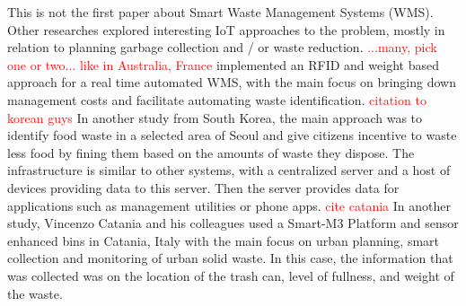 \documentclass{sigchi}
\newcommand\todo[1]{\textcolor{red}{#1}}
\begin{document}
This is not the first paper about Smart Waste Management Systems (WMS).
Other researches explored interesting IoT approaches to the problem, mostly in relation to planning garbage collection and / or waste reduction.
\todo{...many, pick one or two... like in Australia, France} implemented an RFID and weight  based approach for a real time automated WMS, with the main focus on bringing down management costs and facilitate automating waste identification.
\todo{ citation to korean guys } In another study from South Korea, the main approach was to identify food waste in a selected area of Seoul and give citizens incentive to waste less food by fining them based on the amounts of waste they dispose.
The infrastructure is similar to other systems, with a centralized server and a host of devices providing data to this server.
Then the server provides data for applications such as management utilities or phone apps.
\todo{ cite catania} In another study, Vincenzo Catania and his colleagues used a Smart-M3 Platform and sensor enhanced bins in Catania, Italy with the main focus on urban planning, smart collection and  monitoring of urban solid waste. In this case, the information that was collected was on the location of the trash can, level of fullness, and weight of the waste.






\end{document}
